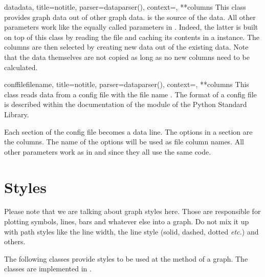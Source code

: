 \begin{classdesc}{data}{data, title=notitle, parser=dataparser(),
                        context={}, **columns}
  This class provides graph data out of other graph data. 
  is the source of the data. All other parameters work like the equally
  called parameters in . Indeed, the latter is
  built on top of this class by reading the file and caching its
  contents in a  instance. The columns are then
  selected by creating new data out of the existing data. Note that
  the data themselves are not copied as long as no new columns need to be
  calculated.
\end{classdesc}

\begin{classdesc}{conffile}{filename, title=notitle,
                            parser=dataparser(), context={},
                            **columns}
  This class reads data from a config file with the file name
  . The format of a config file is described within the
  documentation of the  module of the Python
  Standard Library.

  Each section of the config file becomes a data line. The options in
  a section are the columns. The name of the options will be used as
  file column names. All other parameters work as in
   and  since they all use
  the same code.
\end{classdesc}

\section{Styles\label{graph:style}}


Please note that we are talking about graph styles here. Those are
responsible for plotting symbols, lines, bars and whatever else into a
graph. Do not mix it up with path styles like the line width, the line
style (solid, dashed, dotted \emph{etc.}) and others.

The following classes provide styles to be used at the 
method of a graph. The classes are implemented in .


